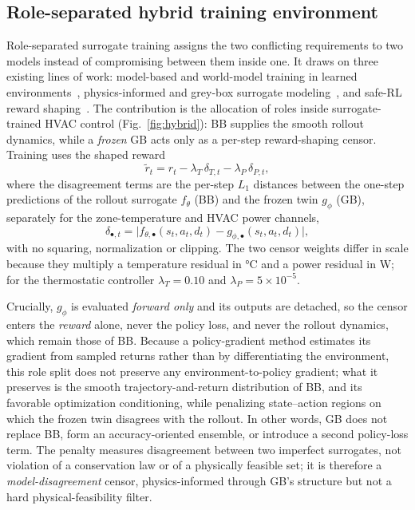 \documentclass[energies,article,submit,moreauthors]{Definitions/mdpi}
\begin{document}
\subsection{Role-separated hybrid training environment}\label{ssec:hybrid}
Role-separated surrogate training assigns the two conflicting requirements to two models instead of
compromising between them inside one. It draws on three existing lines of work: model-based and world-model training in learned
environments~\cite{Sutton1991Dyna,Hafner2025Dreamer}, physics-informed and grey-box surrogate
modeling~\cite{Bacher2011RCIdentification,Raissi2019PINN,Willard2022PIML}, and safe-RL reward
shaping~\cite{Garcia2015SafeRL,Wang2025SafeDRL}. The contribution is the allocation of roles inside
surrogate-trained HVAC control (Fig.~\ref{fig:hybrid}): BB supplies the smooth rollout dynamics,
while a \emph{frozen} GB acts only as a per-step reward-shaping censor. Training uses the shaped
reward
\begin{equation}
\tilde{r}_t=r_t-\lambda_T\,\delta_{T,t}-\lambda_P\,\delta_{P,t},
\label{eq:hybrid}
\end{equation}
where the disagreement terms are the per-step $L_1$ distances between the one-step predictions of
the rollout surrogate $f_\theta$ (BB) and the frozen twin $g_\phi$ (GB), separately for the
zone-temperature and HVAC power channels,
\begin{equation*}
\delta_{\bullet,t}=\big|f_{\theta,\bullet}(s_t,a_t,d_t)-g_{\phi,\bullet}(s_t,a_t,d_t)\big|,
\end{equation*}
with no squaring, normalization or clipping. The two censor weights differ in scale because they
multiply a temperature residual in \si{\celsius} and a power residual in \si{\watt}; for the
thermostatic controller $\lambda_T=0.10$ and $\lambda_P=5\times10^{-5}$.

Crucially, $g_\phi$ is evaluated \emph{forward only} and its outputs are detached, so the censor
enters the \emph{reward} alone, never the policy loss, and never the rollout dynamics, which remain
those of BB. Because a policy-gradient method estimates its gradient from sampled returns rather
than by differentiating the environment, this role split does not preserve any
environment-to-policy gradient; what it preserves is the smooth trajectory-and-return distribution
of BB, and its favorable optimization conditioning, while penalizing state--action regions on which
the frozen twin disagrees with the rollout. In other words, GB does not replace BB, form an
accuracy-oriented ensemble, or introduce a second policy-loss term. The penalty measures
disagreement between two imperfect surrogates, not violation of a conservation law or of a
physically feasible set; it is therefore a \emph{model-disagreement} censor, physics-informed
through GB's structure but not a hard physical-feasibility filter.
\end{document}
